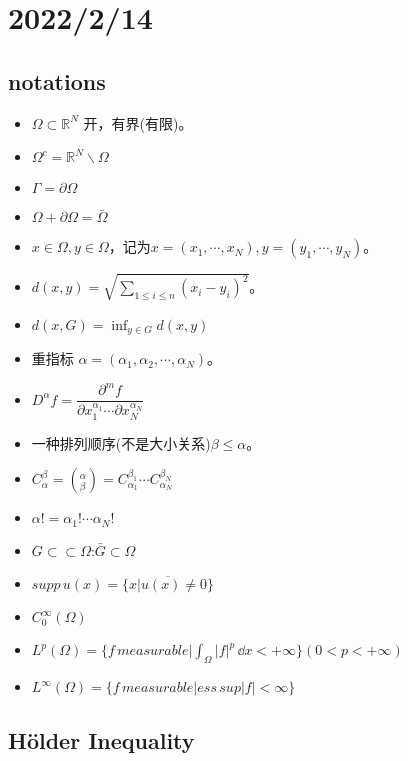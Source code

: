 \section{2022/2/14}

\subsection{notations}

\begin{itemize}
    \item $\Omega \subset \mathbb{R}^N $ 开，有界(有限)。
    \item $\Omega^c=\mathbb{R}^N\backslash \Omega$
    \item $\Gamma=\partial \Omega$
    \item $\Omega+\partial \Omega=\bar{\Omega}$
    \item $x\in \Omega,y\in \Omega$，记为$x=(x_1,\cdots,x_N),y=(y_1,\cdots,y_N)$。
    \item $d(x,y)=\sqrt{\sum_{1\leq i\leq n}(x_i-y_i)^2}$。
    \item $d(x,G)=\inf_{y\in G}d(x,y)$
    \item 重指标 $\alpha=(\alpha_1,\alpha_2,\cdots,\alpha_N)$。
    \item $D^\alpha f=\dfrac{\partial^m f}{\partial x_1^{\alpha_1}\cdots \partial x_N^{\alpha_N} }$
    \item 一种排列顺序(不是大小关系)$\beta\leq \alpha$。
    \item $C_\alpha^\beta=(_\beta^\alpha)=C_{\alpha_1}^{\beta_1}\cdots C_{\alpha_N}^{\beta_N}$
    \item $\alpha !=\alpha_1 !\cdots \alpha_N !$
    \item $G\subset \subset \Omega$:$\bar{G}\subset \Omega$
    \item $supp\, u(x)=\overline{\{x\big| u(x)\neq 0\}}$
    \item $C_0^\infty(\Omega)$
    \item $L^p(\Omega)=\{f\, measurable\big| \int_{\Omega}|f|^p\,\dd x<+\infty\}(0<p<+\infty)$
    \item $L^{\infty}(\Omega)=\{f\, measurable\big| ess \, sup |f|<\infty\}$
\end{itemize}

\subsection{H{\"o}lder Inequality}

